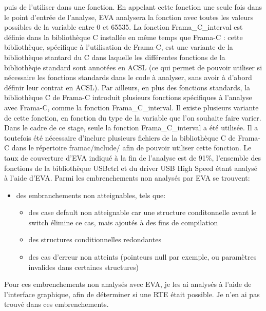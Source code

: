 puis de l'utiliser dans une fonction. En appelant cette fonction une seule fois dans le point d'entrée de l'analyse, EVA analysera la fonction avec toutes les valeurs possibles de la variable entre 0 et 65535.
\newline \noindent La fonction Frama\_C\_interval est définie dans la bibliothèque C installée en même temps que Frama-C : cette bibliothèque, spécifique à l'utilisation de Frama-C, est une variante de la bibliothèque stantard du C dans laquelle les différentes fonctions de la bibliothèqie standard sont annotées en ACSL (ce qui permet de pouvoir utiliser si nécessaire les fonctions standards dans le code à analyser, sans avoir à d'abord définir leur contrat en ACSL). Par ailleurs, en plus des fonctions standards, la bibliothèque C de Frama-C introduit plusieurs fonctions spécifiques à l'analyse avec Frama-C, comme la fonction Frama\_C\_interval. Il existe plusieurs variante de cette fonction, en fonction du type de la variable que l'on souhaite faire varier. Dans le cadre de ce stage, seule la fonction Frama\_C\_interval a été utilisée. Il a toutefois été nécessaire d'inclure plusieurs fichiers de la bibliothèque C de Frama-C dans le répertoire framac/include/ afin de pouvoir utiliser cette fonction.
\newline \noindent
Le taux de couverture d'EVA indiqué à la fin de l'analyse est de 91\%, l'ensemble des fonctions de la bibliothèque USBctrl et du driver USB High Speed étant analysé à l'aide d'EVA. Parmi les embrenchements non analysés par EVA se trouvent:
\begin{itemize}
	\item des embranchements non atteignables, tels que:
		\begin{itemize}
			\item des case default non atteignable car une structure conditonnelle avant le switch élimine ce cas, mais ajoutés à des fins de compilation
			\item des structures conditionnelles redondantes
			\item des cas d'erreur non atteints (pointeurs null par exemple, ou paramètres invalides dans certaines structures)
		\end{itemize}
\end{itemize}

Pour ces embrenchements non analysés avec EVA, je les ai analysés à l'aide de l'interface graphique, afin de déterminer si une RTE était possible. Je n'en ai pas trouvé dans ces embrenchements.



